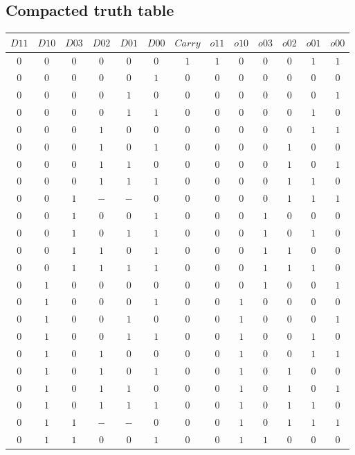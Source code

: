 \documentclass [15pt,a4paper,twoside]{article}
\begin{document}
\subsection{Compacted truth table}
\begin{center}
\begin{tabular}{cccccc|ccccccc}
$D11$&$D10$&$D03$&$D02$&$D01$&$D00$&$Carry$&$o11$&$o10$&$o03$&$o02$&$o01$&$o00$\\
\hline
$0$&$0$&$0$&$0$&$0$&$0$&$1$&$1$&$0$&$0$&$0$&$1$&$1$\\
$0$&$0$&$0$&$0$&$0$&$1$&$0$&$0$&$0$&$0$&$0$&$0$&$0$\\
$0$&$0$&$0$&$0$&$1$&$0$&$0$&$0$&$0$&$0$&$0$&$0$&$1$\\
$0$&$0$&$0$&$0$&$1$&$1$&$0$&$0$&$0$&$0$&$0$&$1$&$0$\\
$0$&$0$&$0$&$1$&$0$&$0$&$0$&$0$&$0$&$0$&$0$&$1$&$1$\\
$0$&$0$&$0$&$1$&$0$&$1$&$0$&$0$&$0$&$0$&$1$&$0$&$0$\\
$0$&$0$&$0$&$1$&$1$&$0$&$0$&$0$&$0$&$0$&$1$&$0$&$1$\\
$0$&$0$&$0$&$1$&$1$&$1$&$0$&$0$&$0$&$0$&$1$&$1$&$0$\\
$0$&$0$&$1$&$-$&$-$&$0$&$0$&$0$&$0$&$0$&$1$&$1$&$1$\\
$0$&$0$&$1$&$0$&$0$&$1$&$0$&$0$&$0$&$1$&$0$&$0$&$0$\\
$0$&$0$&$1$&$0$&$1$&$1$&$0$&$0$&$0$&$1$&$0$&$1$&$0$\\
$0$&$0$&$1$&$1$&$0$&$1$&$0$&$0$&$0$&$1$&$1$&$0$&$0$\\
$0$&$0$&$1$&$1$&$1$&$1$&$0$&$0$&$0$&$1$&$1$&$1$&$0$\\
$0$&$1$&$0$&$0$&$0$&$0$&$0$&$0$&$0$&$1$&$0$&$0$&$1$\\
$0$&$1$&$0$&$0$&$0$&$1$&$0$&$0$&$1$&$0$&$0$&$0$&$0$\\
$0$&$1$&$0$&$0$&$1$&$0$&$0$&$0$&$1$&$0$&$0$&$0$&$1$\\
$0$&$1$&$0$&$0$&$1$&$1$&$0$&$0$&$1$&$0$&$0$&$1$&$0$\\
$0$&$1$&$0$&$1$&$0$&$0$&$0$&$0$&$1$&$0$&$0$&$1$&$1$\\
$0$&$1$&$0$&$1$&$0$&$1$&$0$&$0$&$1$&$0$&$1$&$0$&$0$\\
$0$&$1$&$0$&$1$&$1$&$0$&$0$&$0$&$1$&$0$&$1$&$0$&$1$\\
$0$&$1$&$0$&$1$&$1$&$1$&$0$&$0$&$1$&$0$&$1$&$1$&$0$\\
$0$&$1$&$1$&$-$&$-$&$0$&$0$&$0$&$1$&$0$&$1$&$1$&$1$\\
$0$&$1$&$1$&$0$&$0$&$1$&$0$&$0$&$1$&$1$&$0$&$0$&$0$\\

\end{tabular}
\end{center}
\end{document}
